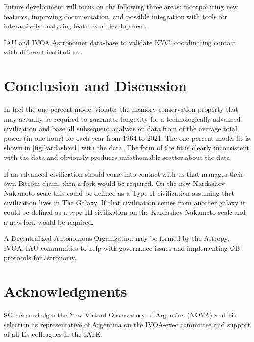 \documentclass[final,5p,times,twocolumn,authoryear]{elsarticle}
\begin{document}
Future development will focus on the following three areas: incorporating
new features, improving documentation, and 
possible integration with tools for interactively analyzing features of development.

IAU and IVOA Astronomer data-base to validate KYC, coordinating contact with different institutions. 

\section{Conclusion and Discussion}
\label{sec:conc}
In fact the one-percent model violates the memory conservation property that may actually be required to guarantee longevity for a technologically advanced civilization and base all subsequent analysis on data from \cite{owidenergy} of the average total power (in one hour) for each year from 1964 to 2021. The one-percent model fit is shown in \ref{fig:kardashev1} with the data. The form of the fit is clearly inconsistent with the data and obviously produces unfathomable scatter about the data.

If an advanced civilization should come into contact with us that manages their own Bitcoin chain, then a fork would be required. On the new Kardashev-Nakamoto scale this could be defined as a Type-II civilization assuming that civilization lives in The Galaxy. If that civilization comes from another galaxy it could be defined as a type-III civilization on the Kardashev-Nakamoto scale and a new fork would be required.

A Decentralized Autonomous Organization may be formed by the Astropy, IVOA, IAU communities to help with governance issues and implementing OB protocols for astronomy.
\section{Acknowledgments}
SG acknowledges the New Virtual Observatory of Argentina (NOVA) and his selection as representative of Argentina on the IVOA-exec committee and support of all his colleagues in the IATE.

%


\end{document}
